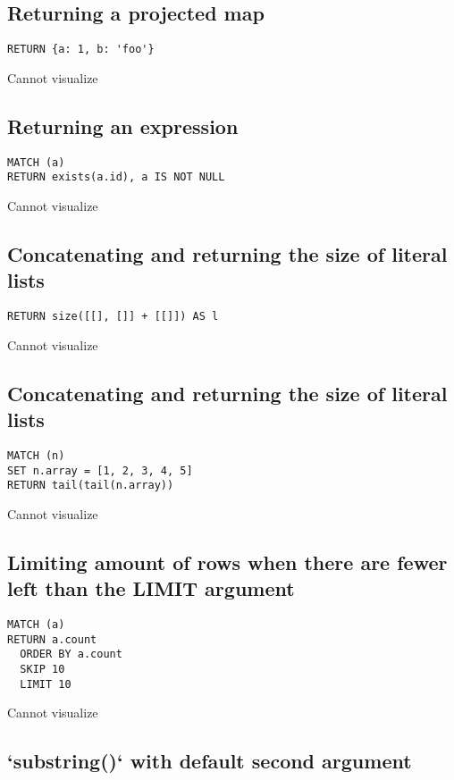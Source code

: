 \subsection{Returning a projected map}

\begin{lstlisting}
RETURN {a: 1, b: 'foo'}
\end{lstlisting}

Cannot visualize
\subsection{Returning an expression}

\begin{lstlisting}
MATCH (a)
RETURN exists(a.id), a IS NOT NULL
\end{lstlisting}

Cannot visualize
\subsection{Concatenating and returning the size of literal lists}

\begin{lstlisting}
RETURN size([[], []] + [[]]) AS l
\end{lstlisting}

Cannot visualize
\subsection{Concatenating and returning the size of literal lists}

\begin{lstlisting}
MATCH (n)
SET n.array = [1, 2, 3, 4, 5]
RETURN tail(tail(n.array))
\end{lstlisting}

Cannot visualize
\subsection{Limiting amount of rows when there are fewer left than the LIMIT argument}

\begin{lstlisting}
MATCH (a)
RETURN a.count
  ORDER BY a.count
  SKIP 10
  LIMIT 10
\end{lstlisting}

Cannot visualize
\subsection{`substring()` with default second argument}

